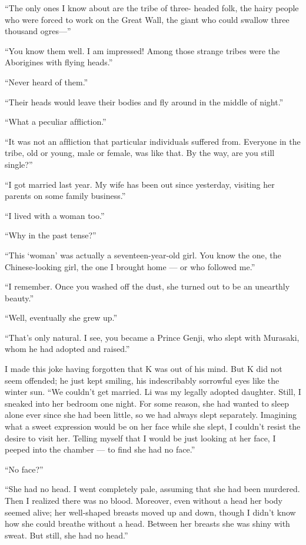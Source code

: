 \documentclass[a6paper]{article}
\begin{document}
“The only ones I know about are the tribe of three-
headed folk, the hairy people who were forced to work on
the Great Wall, the giant who could swallow three thousand
ogres—”

“You know them well.  I am impressed! Among those
strange tribes were the Aborigines with ﬂying heads.”

“Never heard of them.”

“Their heads would leave their bodies and ﬂy around in
the middle of night.”

“What a peculiar afﬂiction.”

“It was not an afﬂiction that particular individuals suffered
from.  Everyone in the tribe, old or young, male or
female, was like that.  By the way, are you still single?”

“I got married last year.  My wife has been out since
yesterday, visiting her parents on some family business.”

“I lived with a woman too.”

“Why in the past tense?”

“This `woman' was actually a seventeen-year-old girl.
You know the one, the Chinese-looking girl, the one I
brought home --- or who followed me.”

“I remember.  Once you washed off the dust, she turned
out to be an unearthly beauty.”

“Well, eventually she grew up.”

“That's only natural.   I see, you became a Prince Genji,
who slept with Murasaki, whom he had adopted and
raised.”

I made this joke having forgotten that K was out of his
mind.   But K did not seem offended; he just kept smiling,
his indescribably sorrowful eyes like the winter sun.
“We couldn't get married.   Li was my legally adopted
daughter.   Still, I sneaked into her bedroom one night.  For
some reason, she had wanted to sleep alone ever since she
had been little, so we had always slept separately.  Imagining
what a sweet expression would be on her face while she
slept, I couldn't resist the desire to visit her.  Telling myself
that I would be just looking at her face, I peeped into the
chamber --- to ﬁnd she had no face.”

“No face?”

“She had no head.  I went completely pale, assuming that
she had been murdered.  Then I realized there was no blood.
Moreover, even without a head her body seemed alive;  her
well-shaped breasts moved up and down, though I didn't
know how she could breathe without a head.  Between her
breasts she was shiny with sweat.  But still, she had no
head.”
\end{document}
